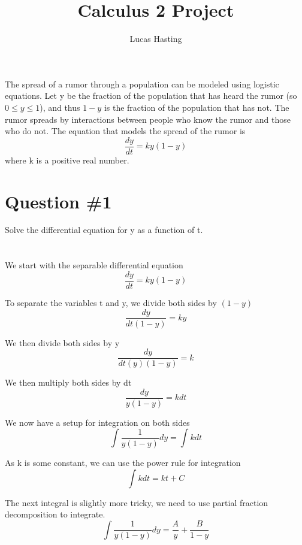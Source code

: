 \documentclass[12pt]{article}
\title{Calculus 2 Project}
\author{Lucas Hasting}
\begin{document}
\date{}
\maketitle

The spread of a rumor through a population can be modeled using logistic equations. Let y be the fraction of the population that has heard the rumor (so $0 \leq y \leq 1$), and thus $1 - y$ is the fraction of the population that has not. The rumor spreads by interactions between people who know the rumor and those who do not. The equation that models the spread of the rumor is
\begin{equation*}
\frac{dy}{dt} = ky(1-y)
\end{equation*}
where k is a positive real number.

\section{Question \#1}
Solve the differential equation for y as a function of t.
\\ \\ \\
We start with the separable differential equation
\begin{equation*}
\frac{dy}{dt} = ky(1-y)
\end{equation*}

To separate the variables t and y, we divide both sides by $(1-y)$
\begin{equation*}
\frac{dy}{dt(1-y)} = ky
\end{equation*}

We then divide both sides by y 
\begin{equation*}
\frac{dy}{dt(y)(1-y)} = k
\end{equation*}

We then multiply both sides by dt 
\begin{equation*}
\frac{dy}{y(1-y)} = kdt
\end{equation*}

We now have a setup for integration on both sides
\begin{equation*}
\int \frac{1}{y(1-y)}dy = \int kdt
\end{equation*}

As k is some constant, we can use the power rule for integration
\begin{equation*}
\int kdt = kt + C
\end{equation*}

The next integral is slightly more tricky, we need to use partial fraction decomposition to integrate.
\begin{equation*}
\int \frac{1}{y(1-y)}dy = \frac{A}{y} + \frac{B}{1-y}
\end{equation*}
\end{document}
